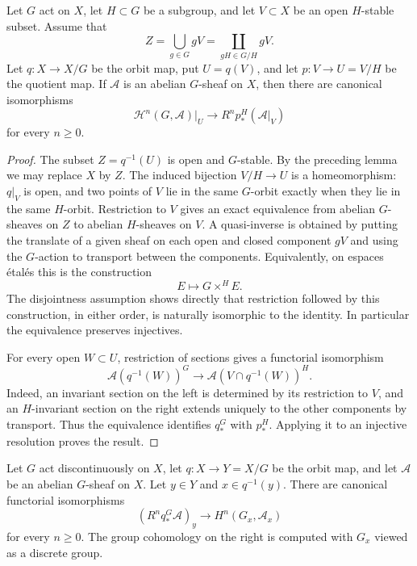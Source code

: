\begin{lemma}
\label{lemma-higher-invariant-direct-image-slice}
\begin{reference}
\cite[Chapter V, \S 5.2, Corollary to Proposition 5.2.1,
p. 200]{Tohoku}
\end{reference}
Let $G$ act on $X$, let $H \subset G$ be a subgroup, and let $V \subset X$
be an open $H$-stable subset. Assume that
$$
Z = \bigcup_{g \in G} gV
    = \coprod_{gH \in G/H} gV.
$$
Let $q : X \to X/G$ be the orbit map, put $U = q(V)$, and let
$p : V \to U = V/H$ be the quotient map. If $\mathcal{A}$ is an abelian
$G$-sheaf on $X$, then there are canonical isomorphisms
$$
\mathcal{H}^n(G, \mathcal{A})|_U
\longrightarrow
R^np_*^H(\mathcal{A}|_V)
$$
for every $n \geq 0$.
\end{lemma}

\begin{proof}
The subset $Z=q^{-1}(U)$ is open and $G$-stable. By the preceding lemma we
may replace $X$ by $Z$. The induced bijection $V/H \to U$ is a
homeomorphism: $q|_V$ is open, and two points of $V$ lie in the same
$G$-orbit exactly when they lie in the same $H$-orbit. Restriction to $V$
gives an exact equivalence from
abelian $G$-sheaves on $Z$ to abelian $H$-sheaves on $V$. A quasi-inverse
is obtained by putting the translate of a given sheaf on each open and
closed component $gV$ and using the $G$-action to transport between the
components. Equivalently, on espaces \'etal\'es this is the construction
$$
E \longmapsto G \mathbin{\times^H} E.
$$
The disjointness assumption shows directly that restriction followed by
this construction, in either order, is naturally isomorphic to the identity.
In particular the equivalence preserves injectives.

For every open $W \subset U$, restriction of sections gives a functorial
isomorphism
$$
\mathcal{A}(q^{-1}(W))^G
\longrightarrow
\mathcal{A}(V \cap q^{-1}(W))^H.
$$
Indeed, an invariant section on the left is determined by its restriction
to $V$, and an $H$-invariant section on the right extends uniquely to the
other components by transport. Thus the equivalence identifies $q_*^G$
with $p_*^H$. Applying it to an injective resolution proves the result.
\end{proof}

\begin{lemma}
\label{lemma-higher-invariant-direct-image-stalk}
\begin{reference}
\cite[Chapter V, \S 5.3, Theorem 5.3.1, p. 204]{Tohoku}
\end{reference}
Let $G$ act discontinuously on $X$, let $q : X \to Y = X/G$ be the orbit
map, and let $\mathcal{A}$ be an abelian $G$-sheaf on $X$. Let $y \in Y$
and $x \in q^{-1}(y)$. There are canonical functorial isomorphisms
$$
(R^nq_*^G\mathcal{A})_y
\longrightarrow
H^n(G_x, \mathcal{A}_x)
$$
for every $n \geq 0$. The group cohomology on the right is computed with
$G_x$ viewed as a discrete group.
\end{lemma}

